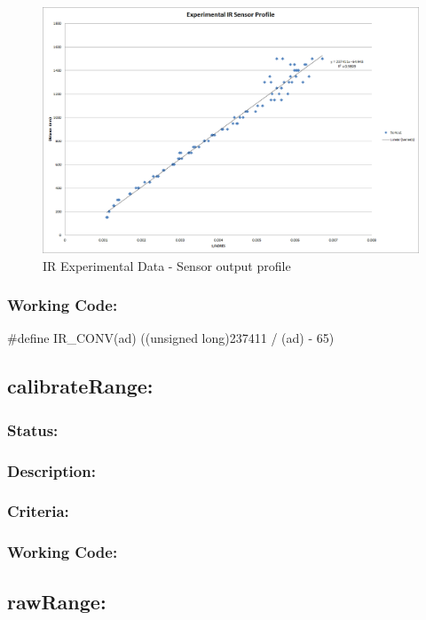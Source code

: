 \documentclass[]{article}
\begin{document}
\begin{figure}
\centering
\includegraphics[width=1\linewidth]{"IR Experimental Data"}
\caption{IR Experimental Data - Sensor output profile}
\label{fig:IRExperimentalData}
\end{figure}


\subsubsection{Working Code:}
\#define IR\_CONV(ad) ((unsigned long)237411 / (ad) - 65) 

\subsection{calibrateRange:}
\subsubsection{Status:}

\subsubsection{Description:}

\subsubsection{Criteria:}

\subsubsection{Working Code:}

\subsection{rawRange:}
\end{document}
